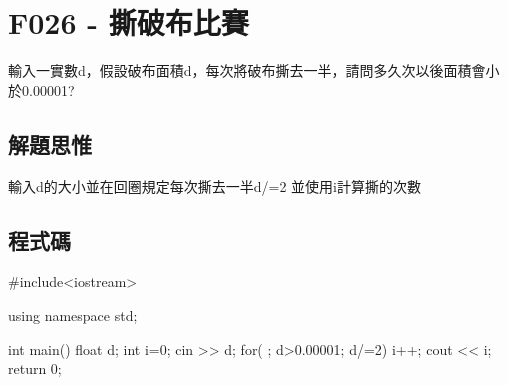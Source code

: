 \section{F026 - 撕破布比賽}
輸入一實數d，假設破布面積d，每次將破布撕去一半，請問多久次以後面積會小於0.00001?
\subsection{解題思惟}輸入d的大小並在回圈規定每次撕去一半d/=2
  並使用i計算撕的次數
\subsection{程式碼}
\begin{cppcode}
#include<iostream>

using namespace std;

int main()
{
	float d;
	int i=0;
	cin >> d;
	for( ; d>0.00001; d/=2) i++;
	cout << i;
	return 0;
}
\end{cppcode}

